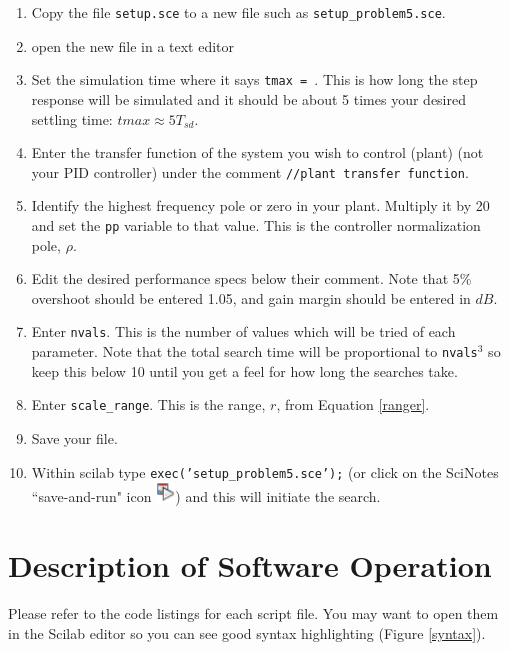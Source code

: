 \begin{enumerate}
  \item Copy the file {\tt setup.sce} to a new file such as {\tt setup\_problem5.sce}.
  \item open the new file in a text editor
  \item Set the simulation time where it says {\tt tmax = }.
This is how long the step response will be simulated and it should be about 5 times your desired settling time: $tmax \approx 5T_{sd}$.
  \item Enter the transfer function of the system you wish to control (plant) (not your PID controller) under the comment {\tt //plant transfer function}.
  \item Identify the highest frequency pole or zero in your plant.  Multiply it by 20 and set the {\tt pp} variable to that value. This is the controller normalization pole, $\rho$.
  \item Edit the desired performance specs below their comment.  Note that 5\% overshoot should be entered 1.05, and gain margin should be entered in $dB$.
  \item Enter {\tt nvals}.  This is the number of values which will be tried of each parameter.
Note that the total search time will be proportional to {\tt nvals}$^3$ so keep this below 10 until you get a feel for how long the searches take.
  \item Enter {\tt scale\_range}.  This is the range, $r$, from Equation \ref{ranger}.
  \item Save your file.
  \item Within scilab type {\tt exec('setup\_problem5.sce');} (or click on the SciNotes ``save-and-run" icon
  \includegraphics[width=0.2in]{figs10/save_run_icon.png}) and this will initiate the search.
\end{enumerate}


\section{Description of Software Operation}

Please refer to the code listings for each script file.  You may want to open them in the Scilab editor so you can see good syntax highlighting (Figure \ref{syntax}).


